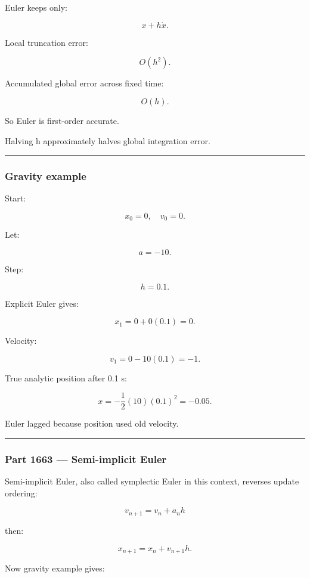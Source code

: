 Euler keeps only:

\[
x+h\dot x.
\]

Local truncation error:

\[
O(h^2).
\]

Accumulated global error across fixed time:

\[
\boxed{
O(h).
}
\]

So Euler is first-order accurate.

Halving h approximately halves global integration error.

\begin{center}\rule{0.5\linewidth}{0.5pt}\end{center}

\subsubsection{Gravity example}\label{gravity-example}

Start:

\[
x_0=0,\quad v_0=0.
\]

Let:

\[
a=-10.
\]

Step:

\[
h=0.1.
\]

Explicit Euler gives:

\[
x_1
=
0+0(0.1)
=
0.
\]

Velocity:

\[
v_1
=
0-10(0.1)
=
-1.
\]

True analytic position after 0.1 s:

\[
x=-\frac12(10)(0.1)^2=-0.05.
\]

Euler lagged because position used old velocity.

\begin{center}\rule{0.5\linewidth}{0.5pt}\end{center}

\subsubsection{Part 1663 --- Semi-implicit Euler}\label{part-1663-semi-implicit-euler}

Semi-implicit Euler, also called symplectic Euler in this context, reverses update ordering:

\[
\boxed{
v_{n+1}
=
v_n+a_nh
}
\]

then:

\[
\boxed{
x_{n+1}
=
x_n+v_{n+1}h.
}
\]

Now gravity example gives:

